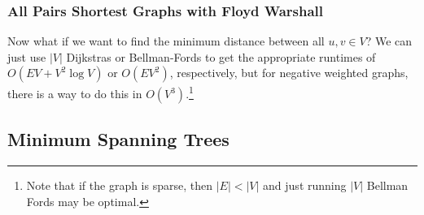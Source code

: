 \subsubsection{All Pairs Shortest Graphs with Floyd Warshall}

  Now what if we want to find the minimum distance between all $u, v \in V$? We can just use $|V|$ Dijkstras or Bellman-Fords to get the appropriate runtimes of $O(EV + V^2 \log{V})$ or $O(EV^2)$, respectively, but for negative weighted graphs, there is a way to do this in $O(V^3)$.\footnote{Note that if the graph is sparse, then $|E| < |V|$ and just running $|V|$ Bellman Fords may be optimal.}

\subsection{Minimum Spanning Trees} 

